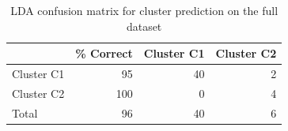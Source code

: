 \begin{table}[htbp]
  \centering
  \caption{LDA confusion matrix for cluster prediction on the full dataset}
  \label{tab:03_LDA_Classification_lda_confusion_matrix}
  \begin{tabular}{lrrr}
    \toprule
     & \% Correct & Cluster C1 & Cluster C2 \\
    \midrule
    Cluster C1 & 95 & 40 & 2 \\
    Cluster C2 & 100 & 0 & 4 \\
    Total & 96 & 40 & 6 \\
    \bottomrule
  \end{tabular}
\end{table}
